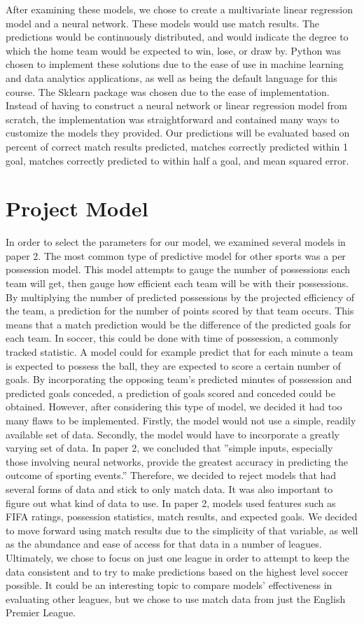 \documentclass[sigconf]{acmart}
\begin{document}
After examining these models, we chose to create a multivariate linear regression model and a neural network. These models would use match results. The predictions would be continuously distributed, and would indicate the degree to which the home team would be expected to win, lose, or draw by. Python was chosen to implement these solutions due to the ease of use in machine learning and data analytics applications, as well as being the default language for this course. The Sklearn package was chosen due to the ease of implementation. Instead of having to construct a neural network or linear regression model from scratch, the implementation was straightforward and contained many ways to customize the models they provided. Our predictions will be evaluated based on percent of correct match results predicted, matches correctly predicted within 1 goal, matches correctly predicted to within half a goal, and mean squared error.

\section{Project Model}
In order to select the parameters for our model, we examined several models in paper 2. The most common type of predictive model for other sports was a per possession model. This model attempts to gauge the number of possessions each team will get, then gauge how efficient each team will be with their possessions. By multiplying the number of predicted possessions by the projected efficiency of the team, a prediction for the number of points scored by that team occurs. This means that a match prediction would be the difference of the predicted goals for each team. In soccer, this could be done with time of possession, a commonly tracked statistic. A model could for example predict that for each minute a team is expected to possess the ball, they are expected to score a certain number of goals. By incorporating the opposing team's predicted minutes of possession and predicted goals conceded, a prediction of goals scored and conceded could be obtained. 
However, after considering this type of model, we decided it had too many flaws to be implemented. Firstly, the model would not use a simple, readily available set of data. Secondly, the model would have to incorporate a greatly varying set of data. In paper 2, we concluded that ''simple inputs, especially those involving neural networks, provide the greatest accuracy in predicting the outcome of sporting events.'' \cite{paper2} Therefore, we decided to reject models that had several forms of data and stick to only match data.
It was also important to figure out what kind of data to use. In paper 2, models used features such as FIFA ratings, possession statistics, match results, and expected goals. We decided to move forward using match results due to the simplicity of that variable, as well as the abundance and ease of access for that data in a number of leagues. Ultimately, we chose to focus on just one league in order to attempt to keep the data consistent and to try to make predictions based on the highest level soccer possible. It could be an interesting topic to compare models' effectiveness in evaluating other leagues, but we chose to use match data from just the English Premier League.
\end{document}

